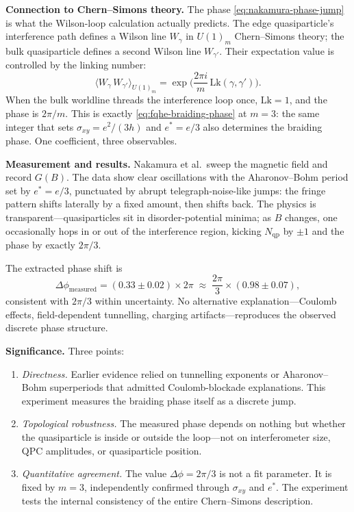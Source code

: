 \medskip
\noindent\textbf{Connection to Chern--Simons theory.}
The phase \eqref{eq:nakamura-phase-jump} is what the Wilson-loop calculation actually predicts.  The edge quasiparticle's interference path defines a Wilson line $W_{\gamma}$ in $U(1)_m$ Chern--Simons theory; the bulk quasiparticle defines a second Wilson line $W_{\gamma'}$.  Their expectation value is controlled by the linking number:
\begin{equation}
  \bigl\langle W_{\gamma}\,W_{\gamma'}\bigr\rangle_{U(1)_m}
  = \exp\!\Big(\frac{2\pi i}{m}\,\mathrm{Lk}(\gamma,\gamma')\Big).
  \label{eq:nakamura-wilson-link}
\end{equation}
When the bulk worldline threads the interference loop once, $\mathrm{Lk} = 1$, and the phase is $2\pi/m$.  This is exactly \eqref{eq:fqhe-braiding-phase} at $m=3$: the same integer that sets $\sigma_{xy} = e^{2}/(3h)$ and $e^{*} = e/3$ also determines the braiding phase.  One coefficient, three observables.

\medskip
\noindent\textbf{Measurement and results.}
Nakamura et al.\ sweep the magnetic field and record $G(B)$.  The data show clear oscillations with the Aharonov--Bohm period set by $e^{*} = e/3$, punctuated by abrupt telegraph-noise-like jumps: the fringe pattern shifts laterally by a fixed amount, then shifts back.  The physics is transparent---quasiparticles sit in disorder-potential minima; as $B$ changes, one occasionally hops in or out of the interference region, kicking $N_{\mathrm{qp}}$ by $\pm 1$ and the phase by exactly $2\pi/3$.

The extracted phase shift is
\begin{equation}
  \Delta\phi_{\mathrm{measured}} = (0.33 \pm 0.02)\times 2\pi
  \;\approx\; \frac{2\pi}{3}\times(0.98 \pm 0.07),
  \label{eq:nakamura-result}
\end{equation}
consistent with $2\pi/3$ within uncertainty.  No alternative explanation---Coulomb effects, field-dependent tunnelling, charging artifacts---reproduces the observed discrete phase structure.

\medskip
\noindent\textbf{Significance.}
Three points:
\begin{enumerate}
  \item \emph{Directness.}  Earlier evidence relied on tunnelling exponents or Aharonov--Bohm superperiods that admitted Coulomb-blockade explanations.  This experiment measures the braiding phase itself as a discrete jump.

  \item \emph{Topological robustness.}  The measured phase depends on nothing but whether the quasiparticle is inside or outside the loop---not on interferometer size, QPC amplitudes, or quasiparticle position.

  \item \emph{Quantitative agreement.}  The value $\Delta\phi = 2\pi/3$ is not a fit parameter.  It is fixed by $m=3$, independently confirmed through $\sigma_{xy}$ and $e^{*}$.  The experiment tests the internal consistency of the entire Chern--Simons description.
\end{enumerate}

